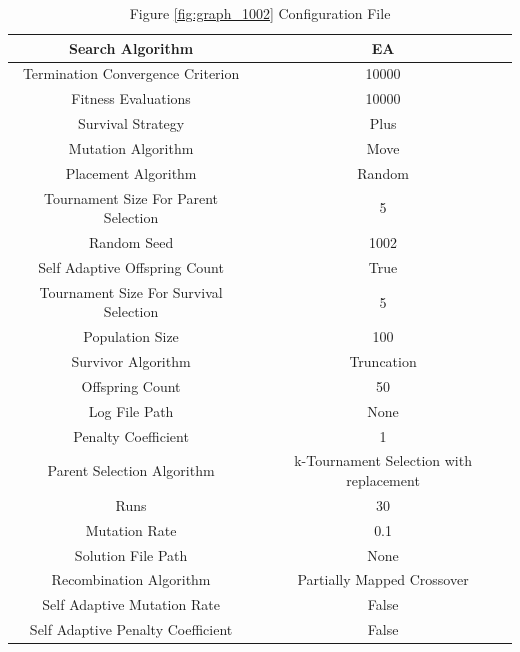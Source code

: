 \documentclass{standalone}
\begin{document}
\begin{table}[!htb]
	\centering
	\caption{Figure \ref{fig:graph_1002} Configuration File}
	\label{tab:graph_1002}
	\begin{tabular}{| c | c |}
		\hline
		Search Algorithm		& EA		 \\
		\hline
		Termination Convergence Criterion		& 10000		 \\
		\hline
		Fitness Evaluations		& 10000		 \\
		\hline
		Survival Strategy		& Plus		 \\
		\hline
		Mutation Algorithm		& Move		 \\
		\hline
		Placement Algorithm		& Random		 \\
		\hline
		Tournament Size For Parent Selection		& 5		 \\
		\hline
		Random Seed		& 1002		 \\
		\hline
		Self Adaptive Offspring Count		& True		 \\
		\hline
		Tournament Size For Survival Selection		& 5		 \\
		\hline
		Population Size		& 100		 \\
		\hline
		Survivor Algorithm		& Truncation		 \\
		\hline
		Offspring Count		& 50		 \\
		\hline
		Log File Path		& None		 \\
		\hline
		Penalty Coefficient		& 1		 \\
		\hline
		Parent Selection Algorithm		& k-Tournament Selection with replacement		 \\
		\hline
		Runs		& 30		 \\
		\hline
		Mutation Rate		& 0.1		 \\
		\hline
		Solution File Path		& None		 \\
		\hline
		Recombination Algorithm		& Partially Mapped Crossover		 \\
		\hline
		Self Adaptive Mutation Rate		& False		 \\
		\hline
		Self Adaptive Penalty Coefficient		& False		 \\
		\hline
	\end{tabular}
\end{table}
\end{document}
